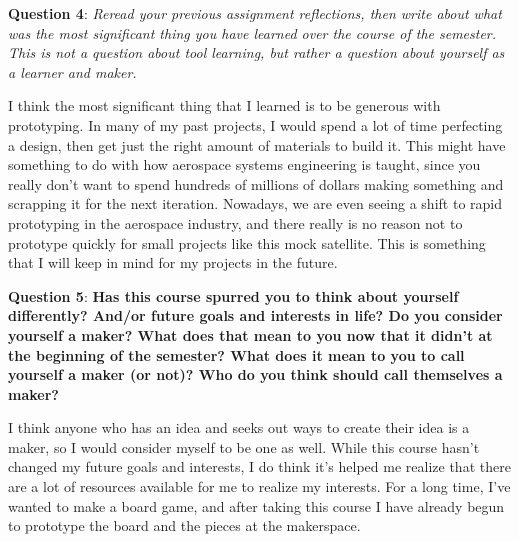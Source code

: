 \textbf{Question 4}: \textit{Reread your previous assignment reflections, then write about what was the most significant thing you have learned over the course of the semester. This is not a question about tool learning, but rather a question about yourself as a learner and maker. }

I think the most significant thing that I learned is to be generous with prototyping. In many of my past projects, I would spend a lot of time perfecting a design, then get just the right amount of materials to build it. This might have something to do with how aerospace systems engineering is taught, since you really don't want to spend hundreds of millions of dollars making something and scrapping it for the next iteration. Nowadays, we are even seeing a shift to rapid prototyping in the aerospace industry, and there really is no reason not to prototype quickly for small projects like this mock satellite. This is something that I will keep in mind for my projects in the future. 

\textbf{Question 5}: \textbf{Has this course spurred you to think about yourself differently? And/or future goals and interests in life? Do you consider yourself a maker? What does that mean to you now that it didn’t at the beginning of the semester? What does it mean to you to call yourself a maker (or not)? Who do you think should call themselves a maker? }

I think anyone who has an idea and seeks out ways to create their idea is a maker, so I would consider myself to be one as well. While this course hasn't changed my future goals and interests, I do think it's helped me realize that there are a lot of resources available for me to realize my interests. For a long time, I've wanted to make a board game, and after taking this course I have already begun to prototype the board and the pieces at the makerspace. 

